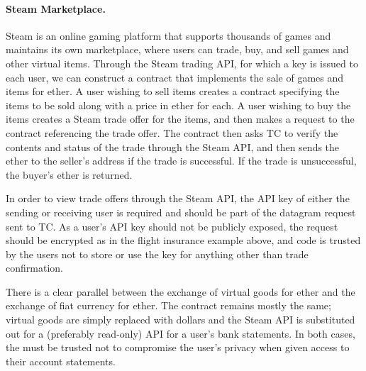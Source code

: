 \paragraph{Steam Marketplace.} Steam  is an online gaming platform that supports thousands of games and maintains its own marketplace, where users can trade, buy, and sell games and other virtual items.  Through the Steam trading API, for which a key is issued to each user, we can construct a contract that implements the sale of games and items for ether.  A user wishing to sell items creates a contract specifying the items to be sold along with a price in ether for each.  A user wishing to buy the items creates a Steam trade offer for the items, and then makes a request to the contract referencing the trade offer.  The contract then asks TC to verify the contents and status of the trade through the Steam API, and then sends the ether to the seller's address if the trade is successful.  If the trade is unsuccessful, the buyer's ether is returned.

In order to view trade offers through the Steam API, the API key of either the sending or receiving user is required and should be part of the datagram request sent to TC.  As a user's API key should not be publicly exposed, the request should be encrypted as in the flight insurance example above, and \encname code is trusted by the users not to store or use the key for anything other than trade confirmation.

There is a clear parallel between the exchange of virtual goods for ether and the exchange of fiat currency for ether.  The contract remains mostly the same; virtual goods are simply replaced with dollars and the Steam API is substituted out for a (preferably read-only) API for a user's bank statements.  In both cases, the \encname must be trusted not to compromise the user's privacy when given access to their account statements.



